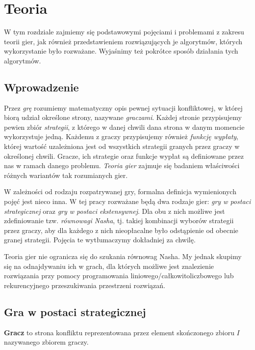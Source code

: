 \documentclass[polish]{standalone}
\begin{document}
\pagestyle{headings}

\chapter{Teoria}

W tym rozdziale zajmiemy się podstawowymi pojęciami i problemami z zakresu teorii gier, jak również przedstawieniem
rozwiązujących je algorytmów, których wykorzystanie było rozważane. Wyjaśnimy też pokrótce sposób działania tych
algorytmów.

\section{Wprowadzenie}

Przez \textit{grę} rozumiemy matematyczny opis pewnej sytuacji konfliktowej, w której biorą udział określone strony,
nazywane \textit{graczami}. Każdej stronie przypisujemy pewien zbiór \textit{strategii}, z którego w danej chwili dana
strona w danym momencie wykorzystuje jedną. Każdemu z graczy przypisujemy również \textit{funkcję wypłaty}, której
wartość uzależniona jest od wszystkich strategii granych przez graczy w określonej chwili. Gracze, ich strategie oraz
funkcje wypłat są definiowane przez nas w ramach danego problemu. \textit{Teoria gier} zajmuje się badaniem właściwości
różnych wariantów tak rozumianych gier.

W zależności od rodzaju rozpatrywanej gry, formalna definicja wymienionych pojęć jest nieco inna. W tej pracy rozważane
będą dwa rodzaje gier: \textit{gry w postaci strategicznej} oraz \textit{gry w postaci ekstensywnej}. Dla obu z nich
możliwe jest zdefiniowanie tzw. \textit{równowagi Nasha}, tj. takiej kombinacji wyborów strategii przez graczy, aby dla
każdego z nich nieopłacalne było odstąpienie od obecnie granej strategii. Pojęcia te wytłumaczymy dokładniej za chwilę.

Teoria gier nie ogranicza się do szukania równowag Nasha. My jednak skupimy się na odnajdywaniu ich w grach, dla
których możliwe jest znalezienie rozwiązania przy pomocy programowania liniowego/całkowitoliczbowego lub rekurencyjnego
przeszukiwania przestrzeni rozwiązań.

\section{Gra w postaci strategicznej}

\begin{definition}
\textbf{Gracz} to strona konfliktu reprezentowana przez element skończonego zbioru $I$ nazywanego zbiorem graczy.
\cite[str.~4]{FT-GT}
\end{definition}
\end{document}
